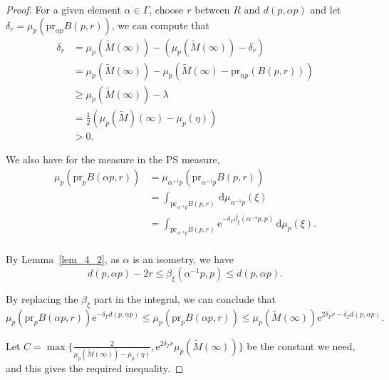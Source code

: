 \documentclass[reqno,11pt]{article}
\theoremstyle{definition}
\theoremstyle{remark}
\numberwithin{equation}{section}
\begin{document}
\begin{proof}
	For a given element $\alpha\in\Gamma$, choose $r$ between $R$ and $d(p,\alpha p)$ and let $\delta_r=\mu_p(\text{pr}_{\alpha p}B(p,r))$, we can compute that
	\begin{displaymath}
		\begin{aligned}
			\delta_r & =\mu_p(\widetilde{M}(\infty))-(\mu_p(\widetilde{M}(\infty))-\delta_r)                   \\
			         & =\mu_p(\widetilde{M}(\infty))-\mu_p(\widetilde{M}(\infty)-\text{pr}_{\alpha p}(B(p,r))) \\
			         & \geq \mu_p(\widetilde{M}(\infty))-\lambda                                               \\
			         & =\frac 12(\mu_p(\widetilde{M})(\infty)-\mu_p(\eta))                                     \\
			         & >0.
		\end{aligned}
	\end{displaymath}

	We also have for the measure in the PS measure,
	\begin{displaymath}
		\begin{aligned}
			\mu_p(\text{pr}_p B(\alpha p,r)) & =\mu_{\alpha^{-1}p}(\text{pr}_{\alpha^{-1}p}B(p,r))                                                                   \\
			                                 & =\int_{\text{pr}_{\alpha^{-1}p}B(p,r)}\,\mathrm{d}\mu_{\alpha^{-1}p}(\xi)                                             \\
			                                 & =\int_{\text{pr}_{\alpha^{-1}p}B(p,r)}\mathrm{e}^{-\delta_\Gamma\beta_{\xi}(\alpha^{-1}p,p)}\,\mathrm{d}\mu_{p}(\xi). \\
		\end{aligned}
	\end{displaymath}

	By Lemma~\ref{lem_4_2}, as $\alpha$ is an isometry, we have
	\begin{displaymath}
		d(p,\alpha p)-2r\leq\beta_{\xi}(\alpha^{-1}p,p)\leq d(p,\alpha p).
	\end{displaymath}

	By replacing the $\beta_{\xi}$ part in the integral, we can conclude that
	\begin{displaymath}
		\mu_p(\text{pr}_p B(\alpha p,r))\mathrm{e}^{-\delta_\Gamma d(p,\alpha p)}\leq \mu_p(\text{pr}_p B(\alpha p,r))\leq\mu_p(\widetilde{M}(\infty))\mathrm{e}^{2\delta_\Gamma r-\delta_\Gamma d(p,\alpha p)}.
	\end{displaymath}

	Let $C=\max\{\frac{2}{\mu_p(\widetilde{M}(\infty))-\mu_p(\eta)},\mathrm{e}^{2\delta_\Gamma r}\mu_p(\widetilde{M}(\infty))\}$ be the constant we need, and this gives the required inequality.
\end{proof}
\end{document}
